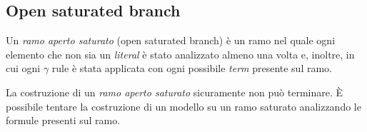 \subsection{Open saturated branch}
Un \textit{ramo aperto saturato} (open saturated branch) è un ramo nel quale ogni elemento che non sia un \textit{literal} è stato analizzato almeno una volta e, inoltre, in cui ogni $\gamma$ rule è stata applicata con ogni possibile \textit{term} presente sul ramo.

La costruzione di un \textit{ramo aperto saturato} sicuramente non può terminare. È possibile tentare la costruzione di un modello su un ramo saturato analizzando le formule presenti sul ramo.